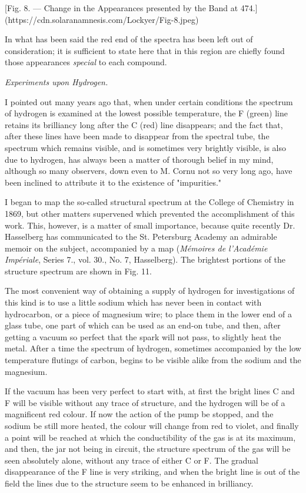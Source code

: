 \documentclass[a4paper, 12pt, oneside, polutonikogreek, english]{article}
\begin{document}
[Fig. 8. --- Change in the Appearances presented by the Band at 474.](https://cdn.solaranamnesis.com/Lockyer/Fig-8.jpeg)

In what has been said the red end of the spectra has been left out of consideration; it is sufficient to state here that in this region are chiefly found those appearances \emph{special} to each compound.

\emph{Experiments upon Hydrogen.}

I pointed out many years ago that, when under certain conditions the spectrum of hydrogen is examined at the lowest possible temperature, the F (green) line retains its brilliancy long after the C (red) line disappears; and the fact that, after these lines have been made to disappear from the spectral tube, the spectrum which remains visible, and is sometimes very brightly visible, is also due to hydrogen, has always been a matter of thorough belief in my mind, although so many observers, down even to M. Cornu not so very long ago, have been inclined to attribute it to the existence of "impurities."

I began to map the so-called structural spectrum at the College of Chemistry in 1869, but other matters supervened which prevented the accomplishment of this work. This, however, is a matter of small importance, because quite recently Dr. Hasselberg has communicated to the St. Petersburg Academy an admirable memoir on the subject, accompanied by a map (\emph{Mémoires de l'Académie Impériale}, Series 7., vol. 30., No. 7, Hasselberg). The brightest portions of the structure spectrum are shown in Fig. 11.

The most convenient way of obtaining a supply of hydrogen for investigations of this kind is to use a little sodium which has never been in contact with hydrocarbon, or a piece of magnesium wire; to place them in the lower end of a glass tube, one part of which can be used as an end-on tube, and then, after getting a vacuum so perfect that the spark will not pass, to slightly heat the metal. After a time the spectrum of hydrogen, sometimes accompanied by the low temperature flutings of carbon, begins to be visible alike from the sodium and the magnesium.

If the vacuum has been very perfect to start with, at first the bright lines C and F will be visible without any trace of structure, and the hydrogen will be of a magnificent red colour. If now the action of the pump be stopped, and the sodium be still more heated, the colour will change from red to violet, and finally a point will be reached at which the conductibility of the gas is at its maximum, and then, the jar not being in circuit, the structure spectrum of the gas will be seen absolutely alone, without any trace of either C or F. The gradual disappearance of the F line is very striking, and when the bright line is out of the field the lines due to the structure seem to be enhanced in brilliancy.
\end{document}
